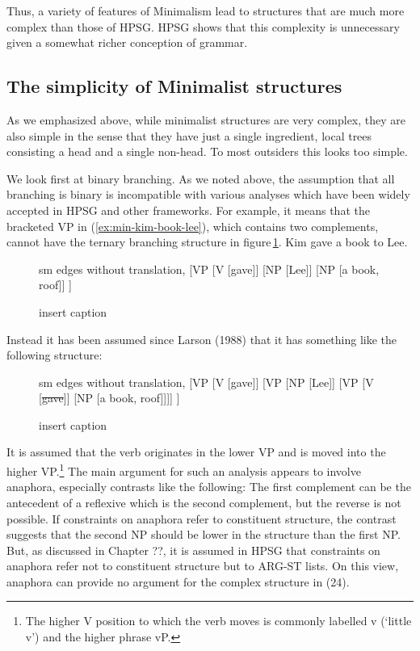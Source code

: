 \documentclass[output=paper]{langsci/langscibook}
\begin{document}
Thus, a variety of features of Minimalism lead to structures that are much more complex than those of HPSG. HPSG shows that this complexity is unnecessary given a somewhat richer conception of grammar. 
\subsection{The simplicity of Minimalist structures}
\label{subsec:min-simplicity}

As we emphasized above, while minimalist structures are very complex, they are also simple in the sense that they have just a single ingredient, local trees consisting a head and a single non-head. To most outsiders this looks too simple.

We look first at binary branching. As we noted above, the assumption that all branching is binary is incompatible with various analyses which have been widely accepted in HPSG and other frameworks. For example, it means that the bracketed VP in (\ref{ex:min-kim-book-lee}), which contains two complements, cannot have the ternary branching structure in figure\,\ref{fig:gave-lee-book}.
\ea
Kim gave a book to Lee.\label{ex:min-kim-book-lee}
\z
\begin{figure}[h!]
	\centering
	\begin{forest} sm edges without translation, 
		[VP
		[V [gave]] [NP [Lee]] [NP [a book, roof]]
		]
	\end{forest}
	\caption{\label{fig:gave-lee-book}insert caption}
\end{figure}

\noindent Instead it has been assumed since Larson (1988) that it has something like the following structure:

\begin{figure}[h!]
	\centering
	\begin{forest} sm edges without translation, 
		[VP
		[V [gave]]
		[VP [NP [Lee]] [VP [V [\sout{gave}]] [NP [a book, roof]]]]
		]
	\end{forest}
	\caption{\label{fig:gave-lee-book-b}insert caption}
\end{figure}

It is assumed that the verb originates in the lower VP and is moved into the higher VP.\footnote{%
The higher V position to which the verb moves is commonly labelled v (`little v') and the higher phrase vP.%
}
The main argument for such an analysis appears to involve anaphora, especially contrasts like the following:
\eal\label{ex:min-john-showed}
\zl 
The first complement can be the antecedent of a reflexive which is the second complement, but the reverse is not possible. If constraints on anaphora refer to constituent structure, the contrast suggests that the second NP should be lower in the structure than the first NP. But, as discussed in Chapter ??, it is assumed in HPSG that constraints on anaphora refer not to constituent structure but to ARG-ST lists. On this view, anaphora can provide no argument for the complex structure in (24).
\end{document}
